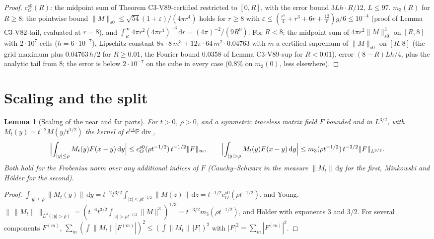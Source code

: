\documentclass[11pt]{article}
\newcommand{\dd}{\,\mathrm d}
\newcommand{\PP}{\mathbb P}
\theoremstyle{plain}
\newtheorem{lemma}[theorem]{Lemma}
\theoremstyle{definition}
\theoremstyle{remark}
\begin{document}
\begin{proof}
\(c_O^{s0}(R)\): the midpoint sum of Theorem C3-V89-certified restricted to
\([0,R]\), with the error bound \(3Lh\cdot R/12\), \(L\le97\).  \(m_3(R)\) for \(R\ge8\): the
pointwise bound \(\|M\|_{s0}\le\sqrt{54}(1+\varepsilon)/(4\pi r^4)\) holds for \(r\ge8\) with
\(\varepsilon\le(\frac{r^5}4+r^3+6r+\frac{12}r)g/6\le10^{-4}\) (proof of Lemma C3-V82-tail, evaluated at
\(r=8\)), and \(\int_R^\infty4\pi r^2(4\pi r^4)^{-3}\dd r=(4\pi)^{-2}/(9R^9)\).  For \(R<8\): the midpoint
sum of \(4\pi r^2\|M\|_{s0}^3\) on \([R,8]\) with \(2\cdot10^7\) cells (\(h=6\cdot10^{-7}\)), Lipschitz
constant \(8\pi\cdot8\,m^3+12\pi\cdot64\,m^2\cdot0.04763\) with \(m\) a certified supremum of
\(\|M\|_{s0}\) on \([R,8]\) (the grid maximum plus \(0.04763\,h/2\) for \(R\ge0.01\), the
Fourier bound \(0.0358\) of Lemma C3-V89-sup for \(R<0.01\)), error
\((8-R)Lh/4\), plus the analytic tail from \(8\); the error is below \(2\cdot10^{-7}\)
on the cube in every case (\(0.8\%\) on \(m_3(0)\), less elsewhere).
\end{proof}

\section{Scaling and the split}
\label{sec:c4v6-split}

\begin{lemma}[Scaling of the near and far parts]
\label{lem:c4v6-scaling}
For \(t>0\), \(\rho>0\), and a symmetric traceless matrix field \(F\) bounded and
in \(L^{3/2}\), with \(M_t(y)=t^{-2}M(y/t^{1/2})\) the kernel of \(e^{t\Delta}\PP\operatorname{div}\),
\begin{equation}
 \Bigl|\int_{|y|\le\rho}M_t(y)F(x-y)\dd y\Bigr|\le c_O^{s0}(\rho t^{-1/2})\,t^{-1/2}\|F\|_\infty,\qquad
 \Bigl|\int_{|y|>\rho}M_t(y)F(x-y)\dd y\Bigr|\le m_3(\rho t^{-1/2})\,t^{-3/2}\|F\|_{L^{3/2}} .
 \label{eq:c4v6-split}
\end{equation}
Both hold for the Frobenius norm over any additional indices of \(F\)
(Cauchy--Schwarz in the measure \(\|M_t\|\dd y\) for the first, Minkowski and
H\"older for the second).
\end{lemma}

\begin{proof}
\(\int_{|y|\le\rho}\|M_t(y)\|\dd y=t^{-2}t^{3/2}\int_{|z|\le\rho t^{-1/2}}\|M(z)\|\dd z=t^{-1/2}c_O^{s0}(\rho t^{-1/2})\), and Young.
\(\|\,\|M_t\|\,\|_{L^3(|y|>\rho)}=(t^{-6}t^{3/2}\int_{|z|>\rho t^{-1/2}}\|M\|^3)^{1/3}=t^{-3/2}m_3(\rho t^{-1/2})\), and H\"older with
exponents \(3\) and \(3/2\).  For several components \(F^{(m)}\),
\(\sum_m(\int\|M_t\||F^{(m)}|)^2\le(\int\|M_t\|\,|F|)^2\) with \(|F|^2=\sum_m|F^{(m)}|^2\).
\end{proof}
\end{document}
